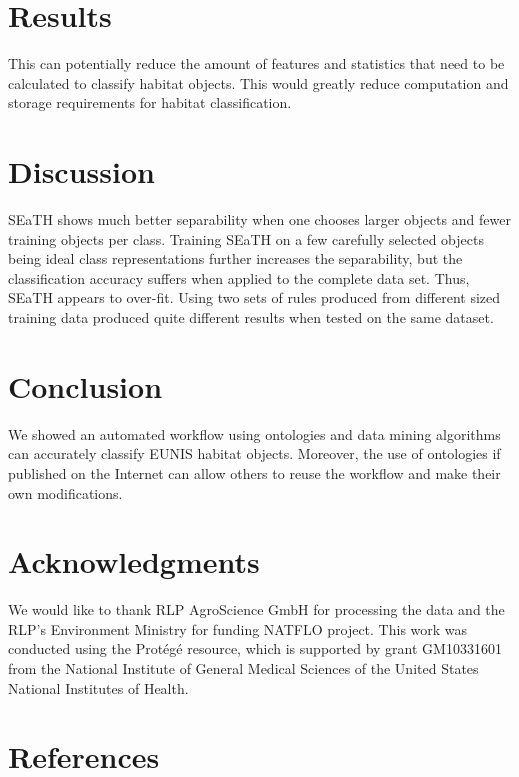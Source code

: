 \documentclass[authoryear, review,12pt,number]{elsarticle}
\begin{document}
\section{Results} This can potentially reduce the amount of features and
statistics that need to be calculated to classify habitat objects. This would
greatly reduce computation and storage requirements for habitat classification.
\section{Discussion} SEaTH shows much better separability when one chooses
larger objects and fewer training objects per class. Training SEaTH on a few
carefully selected objects being ideal class representations further increases
the separability, but the classification accuracy suffers when applied to the
complete data set. Thus, SEaTH appears to over-fit. Using two sets of rules
produced from different sized training data produced quite different results
when tested on the same dataset.
\section{Conclusion} We showed an automated
workflow using ontologies and data mining algorithms can accurately classify
EUNIS habitat objects. Moreover, the use of ontologies if published on the
Internet can allow others to reuse the workflow and make their own
modifications. 
\section{Acknowledgments}
We would like to thank RLP AgroScience GmbH for processing the data and the
RLP's Environment Ministry for funding NATFLO project. This work was conducted
using the Prot\'eg\'e resource, which is supported by grant GM10331601 from the
National Institute of General Medical Sciences of the United States National
Institutes of Health.

\section{References}  
\end{document}
